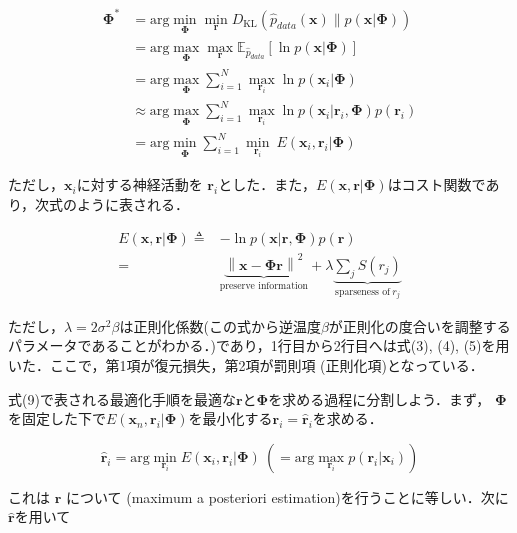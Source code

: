\begin{align}
\mathbf{\Phi}^*&=\text{arg} \min_{\mathbf{\Phi}} \min_{\mathbf{r}} D_{\text{KL}}\left(\hat{p}_{data}(\mathbf{x}) \| p(\mathbf{x}|\mathbf{\Phi})\right)\\
&=\text{arg} \max_{\mathbf{\Phi}} \max_{\mathbf{r}} \mathbb{E}_{\hat{p}_{data}} \left[\ln p(\mathbf{x}|\mathbf{\Phi})\right]\\
&= \text{arg} \max_{\mathbf{\Phi}}\sum_{i=1}^N \max_{\mathbf{r}_i} \ln p(\mathbf{x}_i|\mathbf{\Phi})\\
&\approx \text{arg} \max_{\mathbf{\Phi}}\sum_{i=1}^N \max_{\mathbf{r}_i} \ln p(\mathbf{x}_i|\mathbf{r}_i, \mathbf{\Phi})p(\mathbf{r}_i)\\
&=\text{arg}\min_{\mathbf{\Phi}} \sum_{i=1}^N \min_{\mathbf{r}_i}\ E(\mathbf{x}_i, \mathbf{r}_i|\mathbf{\Phi})
\end{align}


ただし，$\mathbf{x}_i$に対する神経活動を $\mathbf{r}_i$とした．また，$E(\mathbf{x}, \mathbf{r}|\mathbf{\Phi})$はコスト関数であり，次式のように表される．


\begin{align}
E(\mathbf{x}, \mathbf{r}|\mathbf{\Phi})\triangleq&-\ln p(\mathbf{x}|\mathbf{r}, \mathbf{\Phi})p(\mathbf{r})\\
=&\underbrace{\left\|\mathbf{x}-\mathbf{\Phi} \mathbf{r}\right\|^2}_{\text{preserve information}} + \lambda \underbrace{\sum_j S\left(r_j\right)}_{\text{sparseness of}\ r_j}
\end{align}


ただし，$\lambda=2\sigma^2\beta$は正則化係数(この式から逆温度$\beta$が正則化の度合いを調整するパラメータであることがわかる．)であり，1行目から2行目へは式(3), (4), (5)を用いた．ここで，第1項が復元損失，第2項が罰則項 (正則化項)となっている．

式(9)で表される最適化手順を最適な$\mathbf{r}$と$\mathbf{\Phi}$を求める過程に分割しよう．まず， $\mathbf{\Phi}$を固定した下で$E(\mathbf{x}_n, \mathbf{r}_i|\mathbf{\Phi})$を最小化する$\mathbf{r}_i=\hat{\mathbf{r}}_i$を求める．


\begin{equation}
\hat{\mathbf{r}}_i=\text{arg}\min_{\mathbf{r}_i}E(\mathbf{x}_i, \mathbf{r}_i|\mathbf{\Phi})\ \left(= \text{arg}\max_{\mathbf{r}_i}p(\mathbf{r}_i|\mathbf{x}_i)\right)
\end{equation}


これは $\mathbf{r}$ について \textbf{} (maximum a posteriori estimation)を行うことに等しい．次に$\hat{\mathbf{r}}$を用いて


